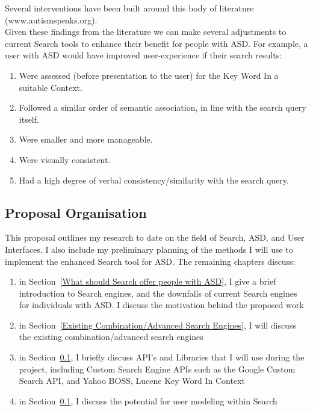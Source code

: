\documentclass[11pt]{article}
\begin{document}
Several interventions have been built around this body of literature (www.autismspeaks.org).\\
Given these findings from the literature we can make several adjustments to current Search tools to enhance their benefit for people with ASD. For example, a user with ASD would 
have improved user-experience if their search results:\\
\begin{enumerate}
\item Were assessed (before presentation to the user) for the Key Word In a suitable Context.\\
\item Followed a similar order of semantic association, in line with the search query itself. \\
\item Were smaller and more manageable.\\
\item Were visually consistent.\\
\item Had a high degree of verbal consistency/similarity with the search query.\\
\end{enumerate}

\subsection{Proposal Organisation}

This proposal outlines my research to date on the field of Search, ASD, and User Interfaces. I also include my preliminary planning of the methods I will use to implement the enhanced Search tool for ASD. The remaining chapters discuss:
\begin{enumerate}
\item in Section~\ref{What should Search offer people with ASD}, I give a brief introduction to Search engines, and the downfalls of current Search engines for individuals with ASD. I discuss the motivation behind the proposed work
\item in Section~\ref{Existing Combination/Advanced Search Engines}, I will discuss the existing combination/advanced search engines
\item in Section~\ref{}, I briefly discuss API's and Libraries that I will use during the project, including Custom Search Engine APIs such as the Google Custom Search API, and Yahoo BOSS, Lucene Key Word In Context
\item in Section~\ref{}, I discuss the potential for user modeling within Search
\end{enumerate}
\end{document}
